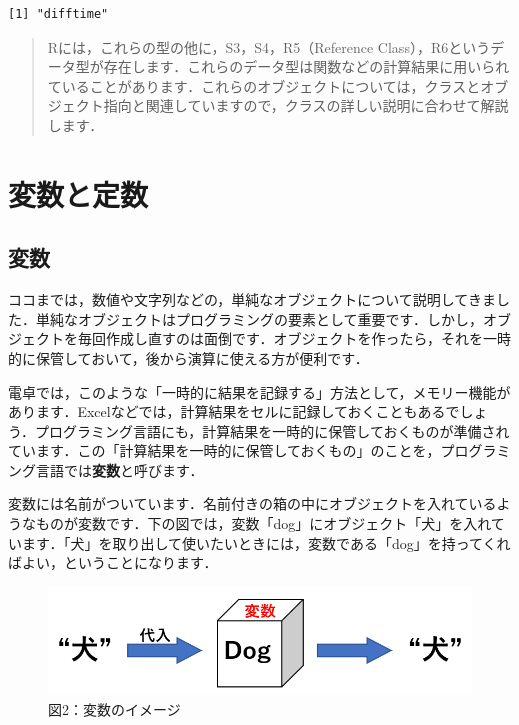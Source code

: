 \documentclass[
  letterpaper,
  DIV=11,
  numbers=noendperiod]{scrreprt}
\begin{document}
\begin{verbatim}
[1] "difftime"
\end{verbatim}

\begin{quote}
Rには，これらの型の他に，S3，S4，R5（Reference
Class），R6というデータ型が存在します．これらのデータ型は関数などの計算結果に用いられていることがあります．これらのオブジェクトについては，クラスとオブジェクト指向と関連していますので，クラスの詳しい説明に合わせて解説します．
\end{quote}

\hypertarget{ux5909ux6570ux3068ux5b9aux6570}{%
\section{変数と定数}\label{ux5909ux6570ux3068ux5b9aux6570}}

\hypertarget{ux5909ux6570}{%
\subsection{変数}\label{ux5909ux6570}}

ココまでは，数値や文字列などの，単純なオブジェクトについて説明してきました．単純なオブジェクトはプログラミングの要素として重要です．しかし，オブジェクトを毎回作成し直すのは面倒です．オブジェクトを作ったら，それを一時的に保管しておいて，後から演算に使える方が便利です．

電卓では，このような「一時的に結果を記録する」方法として，メモリー機能があります．Excelなどでは，計算結果をセルに記録しておくこともあるでしょう．プログラミング言語にも，計算結果を一時的に保管しておくものが準備されています．この「計算結果を一時的に保管しておくもの」のことを，プログラミング言語では\textbf{変数}と呼びます．

変数には名前がついています．名前付きの箱の中にオブジェクトを入れているようなものが変数です．下の図では，変数「dog」にオブジェクト「犬」を入れています．「犬」を取り出して使いたいときには，変数である「dog」を持ってくればよい，ということになります．

\begin{figure}

{\centering \includegraphics{././image/variable_image.png}

}

\caption{図2：変数のイメージ}

\end{figure}
\end{document}

